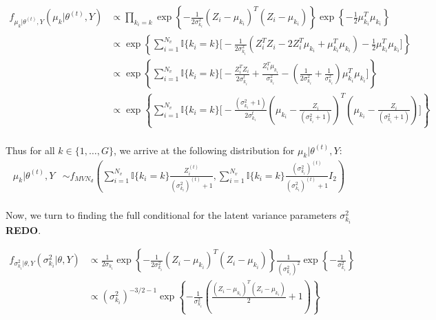 \documentclass{article}
\begin{document}
\begin{align*}
f_{\mu_{k}|\theta^{(t)}, Y}(\mu_k|\theta^{(t)},Y) &\propto \prod_{k_i = k} \exp\left\{-\frac{1}{2\sigma_{k_i}^2}(Z_i - \mu_{k_i})^T(Z_i - \mu_{k_i})\right\}\exp\left\{-\frac{1}{2}\mu_{k_i}^T\mu_{k_i}\right\}\\
&\propto \exp\left\{\sum_{i = 1}^{N_v}\mathbb{I}\{k_i = k\} \Big[-\frac{1}{2\sigma_{k_i}^2}(Z_i^TZ_i - 2Z_i^T\mu_{k_i} + \mu_{k_i}^T\mu_{k_i}) - \frac{1}{2}\mu_{k_i}^T\mu_{k_i} \Big]\right\}\\
&\propto\exp\left\{\sum_{i = 1}^{N_v}\mathbb{I}\{k_i = k\} \Big[-\frac{Z_i^TZ_i}{2\sigma_{k_i}^t} + \frac{Z_i^T\mu_{k_i}}{\sigma_{k_i}^2} - \left(\frac{1}{2\sigma_{k_i}^2} + \frac{1}{\sigma_{k_i}^2}\right)\mu_{k_i}^T\mu_{k_i} \Big] \right\}\\
&\propto\exp\left\{\sum_{i = 1}^{N_v}\mathbb{I}\{k_i = k\} \Big[-\frac{(\sigma_{k_i}^2+1)}{2\sigma_{k_i}^t}\left(\mu_{k_i}-\frac{Z_i}{(\sigma_{k_i}^2+1)}\right)^T\left(\mu_{k_i}-\frac{Z_i}{(\sigma_{k_i}^2+1)}\right)\Big]\right\}\\
\end{align*}

Thus for all $k \in \{1, \ldots, G\}$, we arrive at the following distribution for $\mu_k | \theta^{(t)}, Y$:
\begin{align*}
\mu_{k}|\theta^{(t)},Y&\sim f_{{MVN}_d} \left(\sum_{i = 1}^{N_v}\mathbb{I}\{k_i = k\}\frac{Z_i^{(t)}}{(\sigma_{k_i}^2)^{(t)}+1}, \sum_{i = 1}^{N_v}\mathbb{I}\{k_i = k\}\frac{(\sigma_{k_i}^2)^{(t)}}{(\sigma_{k_i}^2)^{(t)}+1}I_2\right)\\
\end{align*}

Now, we turn to finding the full conditional for the latent variance parameters $\sigma_{k_i}^2$ \textbf{REDO}. 

\begin{align*}
f_{\sigma_{k_i}^2|\theta, Y}(\sigma_{k_i}^2|\theta, Y) &\propto \frac{1}{2\sigma_{k_i}}\exp\left\{-\frac{1}{2\sigma_{k_i}^2}(Z_i-\mu_{k_i})^T(Z_i-\mu_{k_i})\right\}\frac{1}{(\sigma_{k_i}^2)^2}\exp\left\{-\frac{1}{\sigma_{k_i}^2}\right\}\\
&\propto (\sigma_{k_i}^2)^{-3/2-1}\exp\left\{-\frac{1}{\sigma_{k_i}^2}\left(\frac{(Z_i-\mu_{k_i})^T(Z_i-\mu_{k_i})}{2}+1\right)\right\}
\end{align*}
\end{document}
